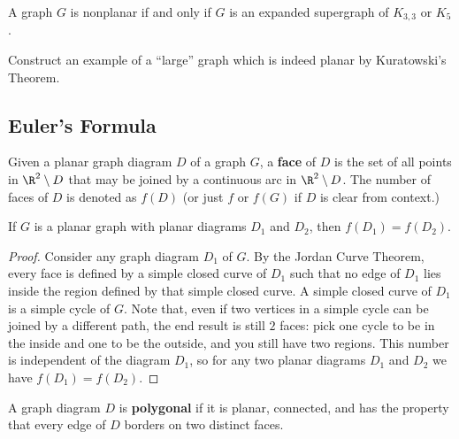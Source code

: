 \begin{theorem} A graph $G$ is nonplanar if and only if $G$ is an expanded supergraph of $K_{3,3}$ or $K_5$.
\end{theorem}

\begin{example} Construct an example of a ``large'' graph which is indeed planar by Kuratowski's Theorem.
\end{example}

\subsection{Euler's Formula}
\begin{definition} Given a planar graph diagram $D$ of a graph $G$, a \textbf{face} of $D$ is the set of all points in $\R^2 \setminus D$ that may be joined by a continuous arc in $\R^2 \setminus D$.  The number of faces of $D$ is denoted as $f(D)$ (or just $f$ or $f(G)$ if $D$ is clear from context.)
\end{definition}

\begin{theorem} If $G$ is a planar graph with planar diagrams $D_1$ and $D_2$, then $f(D_1) = f(D_2)$.
\end{theorem}
\begin{proof}
  Consider any graph diagram $D_1$ of $G$. By the Jordan Curve Theorem, every face is defined by a simple closed curve of $D_1$ such that no edge of $D_1$ lies inside the region defined by that simple closed curve. A simple closed curve of $D_1$ is a simple cycle of $G$. Note that, even if two vertices in a simple cycle can be joined by a different path, the end result is still $2$ faces: pick one cycle to be in the inside and one to be the outside, and you still have two regions. This number is independent of the diagram $D_1$, so for any two planar diagrams $D_1$ and $D_2$ we have $f(D_1) = f(D_2)$.
\end{proof}

\begin{definition} A graph diagram $D$ is \textbf{polygonal} if it is planar, connected, and has the property that every edge of $D$ borders on two distinct faces.
\end{definition}

